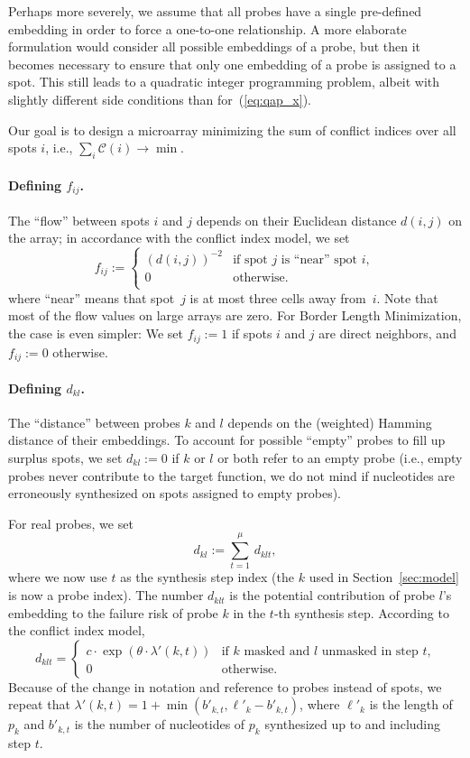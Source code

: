 \documentclass[english]{lni}
\begin{document}
Perhaps more severely, we assume that all probes have a single pre-defined
embedding in order to force a one-to-one relationship.  A more elaborate
formulation would consider all possible embeddings of a probe, but then it
becomes necessary to ensure that only one embedding of a probe is assigned to
a spot. This still leads to a quadratic integer programming problem, albeit
with slightly different side conditions than for~(\ref{eq:qap_x}).

Our goal is to design a microarray minimizing the sum of conflict indices over
all spots $i$, i.e., $\sum_{i} \mathcal{C}(i) \to \min$.


\paragraph{Defining $f_{ij}$.}
The ``flow'' between spots $i$ and $j$ depends on their Euclidean distance
$d(i,j)$ on the array; in accordance with the conflict index model, we set
\begin{equation}
  f_{ij} := \left\{ \begin{array}{ll}
      (d(i,j))^{-2} & \mbox{if spot $j$ is ``near'' spot $i$}, \\
      0 & \mbox{otherwise}. \\
    \end{array} \right.
\end{equation}
where ``near'' means that spot~$j$ is at most three cells away from~$i$. Note
that most of the flow values on large arrays are zero. For Border Length
Minimization, the case is even simpler: We set $f_{ij}:=1$ if spots $i$ and
$j$ are direct neighbors, and $f_{ij}:=0$ otherwise.

\paragraph{Defining $d_{kl}$.}
The ``distance'' between probes $k$ and $l$ depends on the (weighted) Hamming
distance of their embeddings. To account for possible ``empty'' probes to fill
up surplus spots, we set $d_{kl}:=0$ if $k$ or $l$ or both refer to an empty
probe (i.e., empty probes never contribute to the target function, we do not
mind if nucleotides are erroneously synthesized on spots assigned to empty
probes). 

For real probes, we set
\[ d_{kl} := \sum_{t=1}^\mu\, d_{klt}, \]
where we now use $t$ as the synthesis step index (the $k$ used in
Section~\ref{sec:model} is now a probe index). The number $d_{klt}$ is the
potential contribution of probe $l$'s embedding to the failure risk of probe
$k$ in the $t$-th synthesis step. According to the conflict index model,
\[ d_{klt}  = \left\{ \begin{array}{ll}
    c \cdot \exp(\theta \cdot \lambda'(k,t)) 
    & \mbox{if $k$ masked and $l$ unmasked in step $t$,}\\
    0
    & \mbox{otherwise.}
  \end{array} \right.
\]
Because of the change in notation and reference to probes instead of spots, we
repeat that $\lambda'(k,t) = 1 + \min(b'_{k,t},\ell'_{k} - b'_{k,t})$, where
$\ell'_{k}$ is the length of $p_k$ and $b'_{k,t}$ is the number of nucleotides
of $p_k$ synthesized up to and including step $t$.
\end{document}

